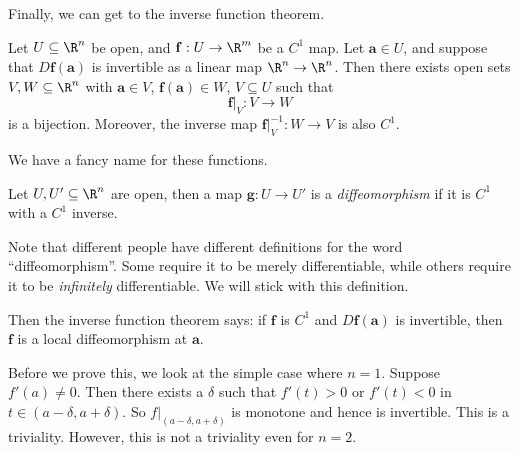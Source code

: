 \documentclass[a4paper]{article}
\begin{document}
Finally, we can get to the inverse function theorem.
\begin{thm}
  Let $U \subseteq \R^n$ be open, and $\mathbf{f}: U \to \R^m$ be a $C^1$ map. Let $\mathbf{a} \in U$, and suppose that $D\mathbf{f}(\mathbf{a})$ is invertible as a linear map $\R^n \to \R^n$. Then there exists open sets $V, W \subseteq \R^n$ with $\mathbf{a} \in V$, $\mathbf{f}(\mathbf{a}) \in W$, $V \subseteq U$ such that
  \[
    \mathbf{f}|_V: V \to W
  \]
  is a bijection. Moreover, the inverse map $\mathbf{f}|_V^{-1}: W \to V$ is also $C^1$.
\end{thm}
We have a fancy name for these functions.
\begin{defi}[Diffeomorphism]
  Let $U, U' \subseteq \R^n$ are open, then a map $\mathbf{g}: U \to U'$ is a \emph{diffeomorphism} if it is $C^1$ with a $C^1$ inverse.
\end{defi}
Note that different people have different definitions for the word ``diffeomorphism''. Some require it to be merely differentiable, while others require it to be \emph{infinitely} differentiable. We will stick with this definition.

Then the inverse function theorem says: if $\mathbf{f}$ is $C^1$ and $D \mathbf{f} (\mathbf{a})$ is invertible, then $\mathbf{f}$ is a local diffeomorphism at $\mathbf{a}$.

Before we prove this, we look at the simple case where $n = 1$. Suppose $f'(a) \not= 0$. Then there exists a $\delta$ such that $f'(t) > 0$ or $f'(t) < 0$ in $t \in (a - \delta, a + \delta)$. So $f|_{(a - \delta, a + \delta)}$ is monotone and hence is invertible. This is a triviality. However, this is not a triviality even for $n = 2$.
\end{document}
